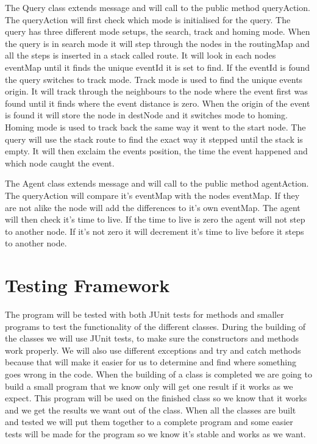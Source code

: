 \documentclass[a4paper,11pt,twoside]{article}
\begin{document}
The Query class extends message and will call to the public method
queryAction. The queryAction will first check which mode is
initialised for the query. The query has three different mode setups,
the search, track and homing mode. When the query is in search mode it
will step through the nodes in the routingMap and all the steps is
inserted in a stack called route. It will look in each nodes eventMap
until it finds the unique eventId it is set to find. If the eventId is
found the query switches to track mode.
Track mode is used to find the unique events origin. It will track
through the neighbours to the node where the event first was found
until it finds where the event distance is zero. When the origin of
the event is found it will store the node in destNode and it switches
mode to homing.
Homing mode is used to track back the same way it went to the start
node. The query will use the stack route to find the exact way it
stepped until the stack is empty.
It will then exclaim the events position, the time the event happened
and which node caught the event.

The Agent class extends message and will call to the public method
agentAction. The queryAction will compare it’s eventMap with the nodes
eventMap. If they are not alike the node will add the differences to
it’s own eventMap. The agent will then check it’s time to live. If the
time to live is zero the agent will not step to another node. If it's
not zero it will decrement it’s time to live before it steps to
another node.

\section{Testing Framework}
The program will be tested with both JUnit tests for methods and
smaller programs to test the functionality of the different classes.
During the building of the classes we will use JUnit tests, to make
sure the constructors and methods work properly. We will also use
different exceptions and try and catch methods because that will make
it easier for us to determine and find where something goes wrong in
the code. When the building of a class is completed we are going to
build a small program that we know only will get one result if it
works as we expect. This program will be used on the finished class so
we know that it works and we get the results we want out of the
class. When all the classes are built and tested we will put them
together to a complete program and some easier tests will be made for
the program so we know it’s stable and works as we want.  


\end{document}
